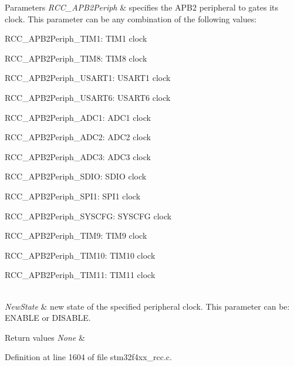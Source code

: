 \begin{DoxyParams}{Parameters}
{\em R\+C\+C\+\_\+\+A\+P\+B2\+Periph} & specifies the A\+P\+B2 peripheral to gates its clock. This parameter can be any combination of the following values\+: \begin{DoxyItemize}
\item R\+C\+C\+\_\+\+A\+P\+B2\+Periph\+\_\+\+T\+I\+M1\+: T\+I\+M1 clock \item R\+C\+C\+\_\+\+A\+P\+B2\+Periph\+\_\+\+T\+I\+M8\+: T\+I\+M8 clock \item R\+C\+C\+\_\+\+A\+P\+B2\+Periph\+\_\+\+U\+S\+A\+R\+T1\+: U\+S\+A\+R\+T1 clock \item R\+C\+C\+\_\+\+A\+P\+B2\+Periph\+\_\+\+U\+S\+A\+R\+T6\+: U\+S\+A\+R\+T6 clock \item R\+C\+C\+\_\+\+A\+P\+B2\+Periph\+\_\+\+A\+D\+C1\+: A\+D\+C1 clock \item R\+C\+C\+\_\+\+A\+P\+B2\+Periph\+\_\+\+A\+D\+C2\+: A\+D\+C2 clock \item R\+C\+C\+\_\+\+A\+P\+B2\+Periph\+\_\+\+A\+D\+C3\+: A\+D\+C3 clock \item R\+C\+C\+\_\+\+A\+P\+B2\+Periph\+\_\+\+S\+D\+IO\+: S\+D\+IO clock \item R\+C\+C\+\_\+\+A\+P\+B2\+Periph\+\_\+\+S\+P\+I1\+: S\+P\+I1 clock \item R\+C\+C\+\_\+\+A\+P\+B2\+Periph\+\_\+\+S\+Y\+S\+C\+FG\+: S\+Y\+S\+C\+FG clock \item R\+C\+C\+\_\+\+A\+P\+B2\+Periph\+\_\+\+T\+I\+M9\+: T\+I\+M9 clock \item R\+C\+C\+\_\+\+A\+P\+B2\+Periph\+\_\+\+T\+I\+M10\+: T\+I\+M10 clock \item R\+C\+C\+\_\+\+A\+P\+B2\+Periph\+\_\+\+T\+I\+M11\+: T\+I\+M11 clock \end{DoxyItemize}
\\
\hline
{\em New\+State} & new state of the specified peripheral clock. This parameter can be\+: E\+N\+A\+B\+LE or D\+I\+S\+A\+B\+LE. \\
\hline
\end{DoxyParams}

\begin{DoxyRetVals}{Return values}
{\em None} & \\
\hline
\end{DoxyRetVals}


Definition at line 1604 of file stm32f4xx\+\_\+rcc.\+c.

\mbox{\label{group___r_c_c___group3_gad94553850ac07106a27ee85fec37efdf}} 

